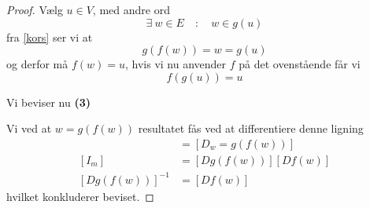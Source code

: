 \begin{proof}
  Vælg $u \in V$, med andre ord
  $$\exists \ w \in E \quad : \quad w \in g(u)$$
  fra \eqref{kors} ser vi at
  $$g(f(w)) = w = g(u)$$
  og derfor må $f(w) = u$, hvis vi nu anvender $f$ på det ovenstående får vi
  $$f(g(u)) = u$$

  Vi beviser nu \textbf{(3)}

  Vi ved at $w  = g(f(w))$ resultatet fås ved at differentiere denne ligning
  \begin{align*}
    [D_ww] &= [D_w = g(f(w))] \\
    [I_m] &= [Dg(f(w))][Df(w)] \\
    [Dg(f(w))]^{-1} &= [Df(w)]
  \end{align*}
  hvilket konkluderer beviset.
\end{proof}
